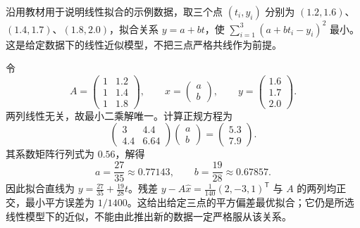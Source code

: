 \begin{example}
\label{ex:least-squares-line}
沿用教材用于说明线性拟合的示例数据，取三个点 $(t_i,y_i)$ 分别为 $(1.2,1.6)$、$(1.4,1.7)$、$(1.8,2.0)$，拟合关系 $y=a+bt$，使 $\sum_{i=1}^3(a+bt_i-y_i)^2$ 最小。这是给定数据下的线性近似模型，不把三点严格共线作为前提。
\end{example}
\begin{solve}
令
\[
    A=\begin{pmatrix}1&1.2\\1&1.4\\1&1.8\end{pmatrix},\qquad
    x=\begin{pmatrix}a\\b\end{pmatrix},\qquad
    y=\begin{pmatrix}1.6\\1.7\\2.0\end{pmatrix}.
\]
两列线性无关，故最小二乘解唯一。计算正规方程为
\[
    \begin{pmatrix}3&4.4\\4.4&6.64\end{pmatrix}
    \begin{pmatrix}a\\b\end{pmatrix}
    =\begin{pmatrix}5.3\\7.9\end{pmatrix}.
\]
其系数矩阵行列式为 $0.56$，解得
\[
    a=\frac{27}{35}\approx0.77143,\qquad
    b=\frac{19}{28}\approx0.67857.
\]
因此拟合直线为 $y=\frac{27}{35}+\frac{19}{28}t$。残差 $y-A\widehat x=\tfrac1{140}(2,-3,1)^{\mathsf T}$ 与 $A$ 的两列均正交，最小平方误差为 $1/1400$。这给出给定三点的平方偏差最优拟合；它仍是所选线性模型下的近似，不能由此推出新的数据一定严格服从该关系。
\end{solve}






